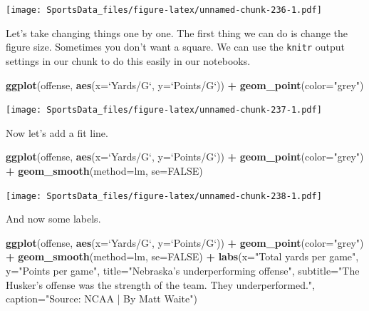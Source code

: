 \documentclass[]{book}
\newenvironment{Shaded}{\begin{snugshade}}{\end{snugshade}}
\newcommand{\KeywordTok}[1]{\textcolor[rgb]{0.13,0.29,0.53}{\textbf{#1}}}
\newcommand{\DataTypeTok}[1]{\textcolor[rgb]{0.13,0.29,0.53}{#1}}
\newcommand{\StringTok}[1]{\textcolor[rgb]{0.31,0.60,0.02}{#1}}
\newcommand{\OtherTok}[1]{\textcolor[rgb]{0.56,0.35,0.01}{#1}}
\newcommand{\OperatorTok}[1]{\textcolor[rgb]{0.81,0.36,0.00}{\textbf{#1}}}
\newcommand{\NormalTok}[1]{#1}
\begin{document}
\texttt{[image: SportsData\_files/figure-latex/unnamed-chunk-236-1.pdf]}

Let's take changing things one by one. The first thing we can do is
change the figure size. Sometimes you don't want a square. We can use
the \texttt{knitr} output settings in our chunk to do this easily in our
notebooks.

\begin{Shaded}
\begin{Highlighting}[]
\KeywordTok{ggplot}\NormalTok{(offense, }\KeywordTok{aes}\NormalTok{(}\DataTypeTok{x=}\StringTok{`}\DataTypeTok{Yards/G}\StringTok{`}\NormalTok{, }\DataTypeTok{y=}\StringTok{`}\DataTypeTok{Points/G}\StringTok{`}\NormalTok{)) }\OperatorTok{+}\StringTok{ }
\StringTok{  }\KeywordTok{geom_point}\NormalTok{(}\DataTypeTok{color=}\StringTok{"grey"}\NormalTok{)}
\end{Highlighting}
\end{Shaded}

\texttt{[image: SportsData\_files/figure-latex/unnamed-chunk-237-1.pdf]}

Now let's add a fit line.

\begin{Shaded}
\begin{Highlighting}[]
\KeywordTok{ggplot}\NormalTok{(offense, }\KeywordTok{aes}\NormalTok{(}\DataTypeTok{x=}\StringTok{`}\DataTypeTok{Yards/G}\StringTok{`}\NormalTok{, }\DataTypeTok{y=}\StringTok{`}\DataTypeTok{Points/G}\StringTok{`}\NormalTok{)) }\OperatorTok{+}\StringTok{ }
\StringTok{  }\KeywordTok{geom_point}\NormalTok{(}\DataTypeTok{color=}\StringTok{"grey"}\NormalTok{) }\OperatorTok{+}\StringTok{ }\KeywordTok{geom_smooth}\NormalTok{(}\DataTypeTok{method=}\NormalTok{lm, }\DataTypeTok{se=}\OtherTok{FALSE}\NormalTok{)}
\end{Highlighting}
\end{Shaded}

\texttt{[image: SportsData\_files/figure-latex/unnamed-chunk-238-1.pdf]}

And now some labels.

\begin{Shaded}
\begin{Highlighting}[]
\KeywordTok{ggplot}\NormalTok{(offense, }\KeywordTok{aes}\NormalTok{(}\DataTypeTok{x=}\StringTok{`}\DataTypeTok{Yards/G}\StringTok{`}\NormalTok{, }\DataTypeTok{y=}\StringTok{`}\DataTypeTok{Points/G}\StringTok{`}\NormalTok{)) }\OperatorTok{+}\StringTok{ }
\StringTok{  }\KeywordTok{geom_point}\NormalTok{(}\DataTypeTok{color=}\StringTok{"grey"}\NormalTok{) }\OperatorTok{+}\StringTok{ }\KeywordTok{geom_smooth}\NormalTok{(}\DataTypeTok{method=}\NormalTok{lm, }\DataTypeTok{se=}\OtherTok{FALSE}\NormalTok{) }\OperatorTok{+}\StringTok{ }
\StringTok{  }\KeywordTok{labs}\NormalTok{(}\DataTypeTok{x=}\StringTok{"Total yards per game"}\NormalTok{, }\DataTypeTok{y=}\StringTok{"Points per game"}\NormalTok{, }\DataTypeTok{title=}\StringTok{"Nebraska's underperforming offense"}\NormalTok{, }\DataTypeTok{subtitle=}\StringTok{"The Husker's offense was the strength of the team. They underperformed."}\NormalTok{, }\DataTypeTok{caption=}\StringTok{"Source: NCAA | By Matt Waite"}\NormalTok{)}
\end{Highlighting}
\end{Shaded}
\end{document}

